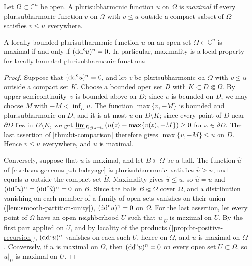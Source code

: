 \begin{definition}\label{def:maximal-plurisubharmonic}
Let $\Omega\subset\mathbb C^n$ be open. A plurisubharmonic function $u$ on $\Omega$ is \emph{maximal} if every plurisubharmonic function $v$ on $\Omega$ with $v\le u$ outside a compact subset of $\Omega$ satisfies $v\le u$ everywhere.
\end{definition}

\begin{theorem}\label{thm:bounded-psh-maximality}
A locally bounded plurisubharmonic function $u$ on an open set $\Omega\subset\mathbb C^n$ is maximal if and only if $(\mathrm{dd}^{\mathrm{c}} u)^n=0$. In particular, maximality is a local property for locally bounded plurisubharmonic functions.
\end{theorem}
\begin{proof}
Suppose that $(\mathrm{dd}^{\mathrm{c}} u)^n=0$, and let $v$ be plurisubharmonic on $\Omega$ with $v\le u$ outside a compact set $K$. Choose a bounded open set $D$ with $K\subset D\Subset\Omega$. By upper semicontinuity, $v$ is bounded above on $\overline D$; since $u$ is bounded on $\overline D$, we may choose $M$ with $-M<\inf_Du$. The function $\max\{v,-M\}$ is bounded and plurisubharmonic on $D$, and it is at most $u$ on $D\setminus K$; since every point of $D$ near $\partial D$ lies in $D\setminus K$, we get $\varliminf_{D\ni z\to x}(u(z)-\max\{v(z),-M\})\ge0$ for $x\in\partial D$. The last assertion of \cref{thm:bt-comparison} therefore gives $\max\{v,-M\}\le u$ on $D$. Hence $v\le u$ everywhere, and $u$ is maximal.

Conversely, suppose that $u$ is maximal, and let $B\Subset\Omega$ be a ball. The function $\widehat u$ of \cref{cor:homogeneous-psh-balayage} is plurisubharmonic, satisfies $\widehat u\ge u$, and equals $u$ outside the compact set $\overline B$. Maximality gives $\widehat u\le u$, so $\widehat u=u$ and $(\mathrm{dd}^{\mathrm{c}} u)^n=(\mathrm{dd}^{\mathrm{c}}\widehat u)^n=0$ on $B$. Since the balls $B\Subset\Omega$ cover $\Omega$, and a distribution vanishing on each member of a family of open sets vanishes on their union (\cref{lem:smooth-partition-unity}), $(\mathrm{dd}^{\mathrm{c}} u)^n=0$ on $\Omega$. For the last assertion, let every point of $\Omega$ have an open neighborhood $U$ such that $u|_U$ is maximal on $U$. By the first part applied on $U$, and by locality of the products (\cref{prop:bt-positive-recursion}), $(\mathrm{dd}^{\mathrm{c}} u)^n$ vanishes on each such $U$, hence on $\Omega$, and $u$ is maximal on $\Omega$. Conversely, if $u$ is maximal on $\Omega$, then $(\mathrm{dd}^{\mathrm{c}} u)^n=0$ on every open set $U\subset\Omega$, so $u|_U$ is maximal on $U$.
\end{proof}

